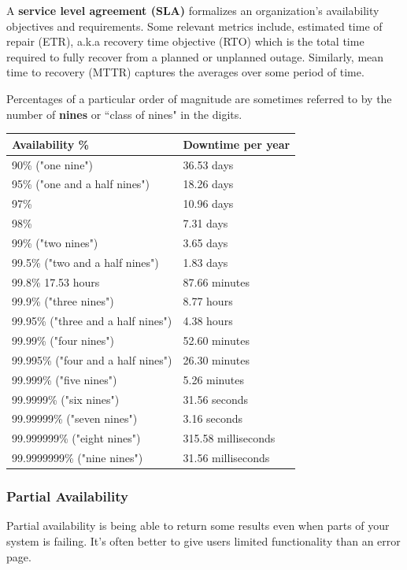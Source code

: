 \documentclass{article}
\begin{document}
    A \textbf{service level agreement (SLA)} formalizes an organization's availability objectives and requirements. Some relevant metrics include, estimated time of repair (ETR), a.k.a recovery time objective (RTO) which is the total time required to fully recover from a planned or unplanned outage. Similarly, mean time to recovery (MTTR) captures the averages over some period of time.
    
    Percentages of a particular order of magnitude are sometimes referred to by the number of \textbf{nines} or ``class of nines" in the digits.

    \begin{table}[H]
        \centering
        \begin{tabular}{|l|l|}
            \hline
            \textbf{Availability \%	}& \textbf{Downtime per year} \\ 
            \hline
            90\% ("one nine") & 36.53 days \\
            95\% ("one and a half nines") &	18.26 days \\
            97\% & 10.96 days	\\
            98\% & 7.31 days	\\
            99\% ("two nines")& 3.65 days	\\
            99.5\% ("two and a half nines") & 1.83 days \\
            99.8\%	17.53 hours	& 87.66 minutes	\\
            99.9\% ("three nines")	& 8.77 hours \\
            99.95\% ("three and a half nines")	& 4.38 hours	\\
            99.99\% ("four nines") & 52.60 minutes	\\
            99.995\% ("four and a half nines") & 26.30 minutes \\
            99.999\% ("five nines") & 5.26 minutes \\
            99.9999\% ("six nines")	& 31.56 seconds \\
            99.99999\% ("seven nines")	& 3.16 seconds	\\
            99.999999\% ("eight nines") & 315.58 milliseconds \\
            99.9999999\% ("nine nines") & 31.56 milliseconds \\
            \hline
        \end{tabular}
    \end{table}
    
    \subsubsection{Partial Availability}
    Partial availability is being able to return some results even when parts of your system is failing. It's often better to give users limited functionality than an error page.
    
\end{document}
